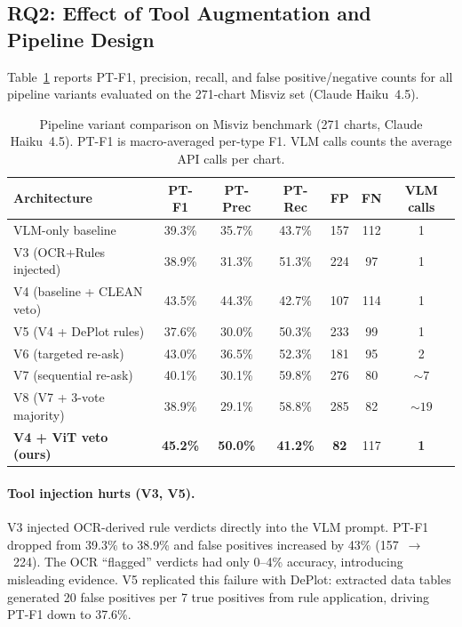 \subsection{RQ2: Effect of Tool Augmentation and Pipeline Design}
\label{sec:rq2}

Table~\ref{tab:pipeline} reports PT-F1, precision, recall, and false positive/negative counts for all pipeline variants evaluated on the 271-chart Misviz set (Claude Haiku~4.5).

\begin{table}[h]
  \centering
  \caption{Pipeline variant comparison on Misviz benchmark (271 charts, Claude Haiku~4.5). PT-F1 is macro-averaged per-type F1. VLM calls counts the average API calls per chart.}
  \label{tab:pipeline}
  \small
  \begin{tabular}{lcccccc}
    \toprule
    Architecture & PT-F1 & PT-Prec & PT-Rec & FP & FN & VLM calls \\
    \midrule
    VLM-only baseline           & 39.3\% & 35.7\% & 43.7\% & 157 & 112 & 1 \\
    V3 (OCR+Rules injected)     & 38.9\% & 31.3\% & 51.3\% & 224 &  97 & 1 \\
    V4 (baseline + CLEAN veto)  & 43.5\% & 44.3\% & 42.7\% & 107 & 114 & 1 \\
    V5 (V4 + DePlot rules)      & 37.6\% & 30.0\% & 50.3\% & 233 &  99 & 1 \\
    V6 (targeted re-ask)        & 43.0\% & 36.5\% & 52.3\% & 181 &  95 & 2 \\
    V7 (sequential re-ask)      & 40.1\% & 30.1\% & 59.8\% & 276 &  80 & ${\sim}7$ \\
    V8 (V7 + 3-vote majority)   & 38.9\% & 29.1\% & 58.8\% & 285 &  82 & ${\sim}19$ \\
    \textbf{V4 + ViT veto (ours)} & \textbf{45.2\%} & \textbf{50.0\%} & \textbf{41.2\%} & \textbf{82} & 117 & \textbf{1} \\
    \bottomrule
  \end{tabular}
\end{table}

\paragraph{Tool injection hurts (V3, V5).}
V3 injected OCR-derived rule verdicts directly into the VLM prompt. PT-F1 dropped from 39.3\% to 38.9\% and false positives increased by 43\% (157~$\to$~224). The OCR ``flagged'' verdicts had only 0--4\% accuracy, introducing misleading evidence. V5 replicated this failure with DePlot: extracted data tables generated 20 false positives per 7 true positives from rule application, driving PT-F1 down to 37.6\%.

